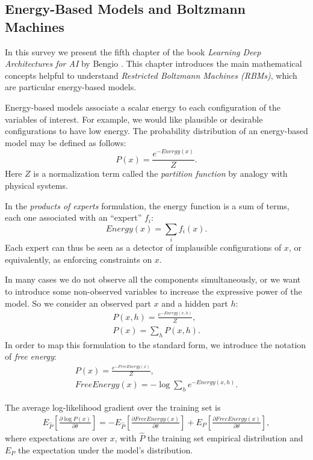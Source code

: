 \subsection{Energy-Based Models and Boltzmann Machines \cite{Bengio2009}}

In this survey we present the fifth chapter of the book \emph{Learning Deep Architectures for AI} by Bengio \cite{Bengio2009}. This chapter introduces the main mathematical concepts helpful to understand \emph{Restricted Boltzmann Machines (RBMs)}, which are particular energy-based models.

Energy-based models associate a scalar energy to each configuration of the variables of interest. For example, we would like plausible or desirable configurations to have low energy. The probability distribution of an energy-based model may be defined as follows:
\begin{equation}\label{equ:1}
P(x) = \frac{e^{-Energy(x)}}{Z}.
\end{equation}
Here $Z$ is a normalization term called the \emph{partition function} by analogy with physical systems.

In the \emph{products of experts} formulation, the energy function is a sum of terms, each one associated with an ``expert'' $f_i$:
\begin{equation}
Energy(x) = \sum_i f_i(x).
\end{equation}
Each expert can thus be seen as a detector of implausible configurations of $x$, or equivalently, as enforcing constraints on $x$.

In many cases we do not observe all the components simultaneously, or we want to introduce some non-observed variables to increase the expressive power of the model. So we consider an observed part $x$ and a hidden part $h$:
\begin{eqnarray}
P(x,h) = \frac{e^{-Energy(x,h)}}{Z},\\
P(x) = \sum_h P(x,h).
\end{eqnarray}
In order to map this formulation to the standard form, we introduce the notation of \emph{free energy}:
\begin{eqnarray}
P(x) = \frac{e^{-FreeEnergy(x)}}{Z},\\
FreeEnergy(x) = - \log \sum_h e^{-Energy(x,h)}.
\end{eqnarray}

The average log-likelihood gradient over the training set is
\begin{eqnarray}
E_{\hat{P}}[\frac{\partial \log P(x)}{\partial \theta}] = - E_{\hat{P}}[\frac{\partial FreeEnergy(x)}{\partial \theta}] + E_P[\frac{\partial FreeEnergy(x)}{\partial\theta}],
\end{eqnarray}
where expectations are over $x$, with $\hat{P}$ the training set empirical distribution and $E_P$ the expectation under the model's distribution.

